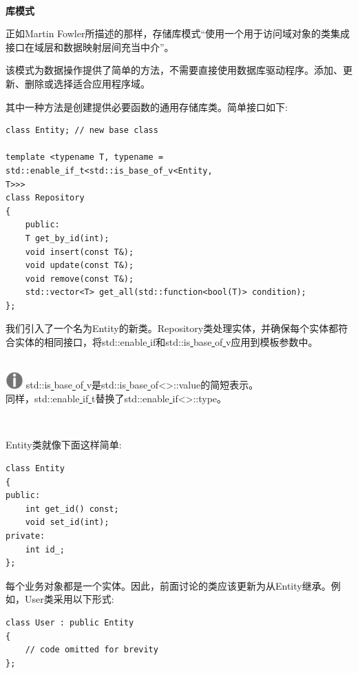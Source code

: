\noindent\textbf{}\ \par
\textbf{库模式} \ \par
正如Martin Fowler所描述的那样，存储库模式“使用一个用于访问域对象的类集成接口在域层和数据映射层间充当中介”。 \par
该模式为数据操作提供了简单的方法，不需要直接使用数据库驱动程序。添加、更新、删除或选择适合应用程序域。 \par
其中一种方法是创建提供必要函数的通用存储库类。简单接口如下: \par

\begin{lstlisting}[caption={}]
class Entity; // new base class

template <typename T, typename = std::enable_if_t<std::is_base_of_v<Entity,
T>>>
class Repository
{
	public:
	T get_by_id(int);
	void insert(const T&);
	void update(const T&);
	void remove(const T&);
	std::vector<T> get_all(std::function<bool(T)> condition);
};
\end{lstlisting}

我们引入了一个名为Entity的新类。Repository类处理实体，并确保每个实体都符合实体的相同接口，将std::enable\underline{ }if和std::is\underline{ }base\underline{ }of\underline{ }v应用到模板参数中。 \par

\hspace*{\fill} \\ %
\includegraphics[width=0.05\textwidth]{images/warn}
std::is\underline{ }base\underline{ }of\underline{ }v是std::is\underline{ }base\underline{ }of<>::value的简短表示。\\同样，std::enable\underline{ }if\underline{ }t替换了std::enable\underline{ }if<>::type。 \par
\noindent\textbf{}\ \par

Entity类就像下面这样简单: \par

\begin{lstlisting}[caption={}]
class Entity
{
public:
	int get_id() const;
	void set_id(int);
private:
	int id_;
};
\end{lstlisting}

每个业务对象都是一个实体。因此，前面讨论的类应该更新为从Entity继承。例如，User类采用以下形式: \par

\begin{lstlisting}[caption={}]
class User : public Entity
{
	// code omitted for brevity
};
\end{lstlisting}

